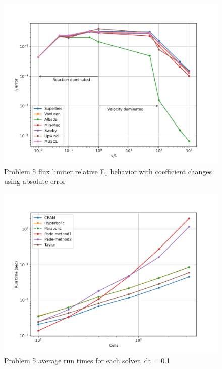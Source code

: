 \clearpage

\begin{figure}[p]
    \centering
    \includegraphics[width=6in]{images/chapter-5/progressionProblems/problem5/problem5CoefficientChanges.png}
    \caption{Problem 5 flux limiter relative E${}_{1}$ behavior with coefficient changes using absolute error}
    \label{fig:problem5_l1error_coefficient_changes}
\end{figure}

\clearpage

\begin{figure}[p]
    \centering
    \includegraphics[width=6in]{images/chapter-5/progressionProblems/problem5/problem5Runtimes.png}
    \caption{Problem 5 average run times for each solver, dt = 0.1}
    \label{fig:problem5_runtimes}
\end{figure}

